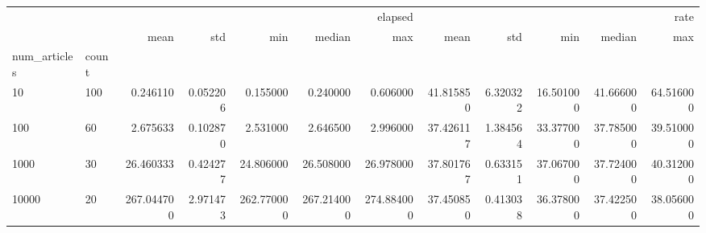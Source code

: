 \begin{tabular}{llrrrrrrrrrr}
 &  & \multicolumn{5}{r}{elapsed} & \multicolumn{5}{r}{rate} \\
 &  & mean & std & min & median & max & mean & std & min & median & max \\
num_articles & count &  &  &  &  &  &  &  &  &  &  \\
10 & 100 & 0.246110 & 0.052206 & 0.155000 & 0.240000 & 0.606000 & 41.815850 & 6.320322 & 16.501000 & 41.666000 & 64.516000 \\
100 & 60 & 2.675633 & 0.102870 & 2.531000 & 2.646500 & 2.996000 & 37.426117 & 1.384564 & 33.377000 & 37.785000 & 39.510000 \\
1000 & 30 & 26.460333 & 0.424277 & 24.806000 & 26.508000 & 26.978000 & 37.801767 & 0.633151 & 37.067000 & 37.724000 & 40.312000 \\
10000 & 20 & 267.044700 & 2.971473 & 262.770000 & 267.214000 & 274.884000 & 37.450850 & 0.413038 & 36.378000 & 37.422500 & 38.056000 \\
\end{tabular}
